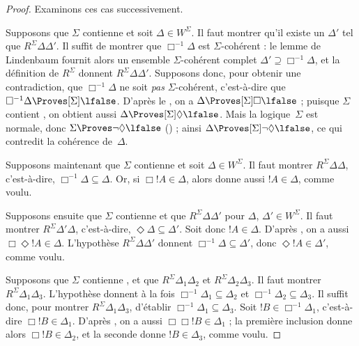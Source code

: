 \documentclass[../../../include/open-logic-section]{subfiles}
\begin{document}
\begin{proof}
  Examinons ces cas successivement.

  Supposons que $\Sigma$ contienne  et soit $\Delta \in W^\Sigma$.
  Il faut montrer qu'il existe un $\Delta'$ tel que $R^\Sigma
  \Delta\Delta'$. Il suffit de montrer que $\Box^{-1}\Delta$ est
  $\Sigma$-cohérent : le lemme de Lindenbaum fournit alors un ensemble
  $\Sigma$-cohérent complet $\Delta' \supseteq
  \Box^{-1}\Delta$, et la définition de $R^\Sigma$
  donnent
  $R^\Sigma \Delta\Delta'$. Supposons donc, pour obtenir une
  contradiction, que $\Box^{-1}\Delta$ ne soit \emph{pas}
  $\Sigma$-cohérent, c'est-à-dire que
  $\Box^{-1}\Delta \Proves[\Sigma] \lfalse$. D'après le
  , on a $\Delta \Proves[\Sigma] \Box\lfalse$ ;
  puisque $\Sigma$ contient , on obtient aussi
  $\Delta \Proves[\Sigma] \Diamond\lfalse$. Mais la logique~$\Sigma$ est normale,
  donc $\Sigma \Proves \lnot\Diamond \lfalse$
  () ; ainsi $\Delta
  \Proves[\Sigma] \lnot\Diamond \lfalse$, ce qui contredit la cohérence
  de~$\Delta$.

  Supposons maintenant que $\Sigma$ contienne  et soit $\Delta \in
  W^\Sigma$. Il faut montrer $R^\Sigma \Delta\Delta$,
  c'est-à-dire,
  $\Box^{-1}\Delta \subseteq \Delta$. Or, si $\Box!A \in \Delta$, alors
   donne aussi $!A \in \Delta$, comme voulu.

  Supposons ensuite que $\Sigma$ contienne  et que $R^\Sigma
  \Delta\Delta'$ pour $\Delta$, $\Delta' \in W^\Sigma$. Il faut
  montrer $R^\Sigma \Delta'\Delta$, c'est-à-dire,
  $\Diamond\Delta \subseteq \Delta'$. Soit donc $!A \in \Delta$.
  D'après , on a aussi $\Box\Diamond!A \in \Delta$. L'hypothèse
  $R^\Sigma \Delta\Delta'$ donnent $\Box^{-1}\Delta
  \subseteq \Delta'$, donc $\Diamond!A \in \Delta'$, comme voulu.

  Supposons que $\Sigma$ contienne , et que $R^\Sigma
  \Delta_1\Delta_2$ et $R^\Sigma \Delta_2\Delta_3$. Il faut montrer
  $R^\Sigma \Delta_1\Delta_3$. L'hypothèse donnent à la fois $\Box^{-1}\Delta_1
  \subseteq \Delta_2$ et $\Box^{-1}\Delta_2 \subseteq \Delta_3$. Il
  suffit donc, pour montrer $R^\Sigma \Delta_1\Delta_3$, d'établir
  $\Box^{-1}\Delta_1 \subseteq \Delta_3$. Soit
  $!B \in \Box^{-1}\Delta_1$, c'est-à-dire $\Box!B \in \Delta_1$.
  D'après , on a aussi $\Box\Box!B \in \Delta_1$ ; la première
  inclusion donne alors $\Box!B \in \Delta_2$, et la seconde donne
  $!B \in \Delta_3$, comme voulu.


\end{proof}
\end{document}
